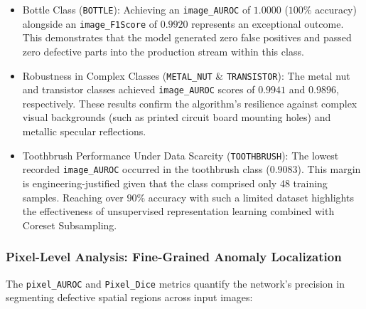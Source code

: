 \documentclass{article}
\begin{document}
\begin{itemize}
	\item Bottle Class (\texttt{BOTTLE}): Achieving an \texttt{image\_AUROC} of $1.0000$ ($100\%$ accuracy) alongside an \texttt{image\_F1Score} of $0.9920$ represents an exceptional outcome. This demonstrates that the model generated zero false positives and passed zero defective parts into the production stream within this class.
	
	\item Robustness in Complex Classes (\texttt{METAL\_NUT} \& \texttt{TRANSISTOR}): The metal nut and transistor classes achieved \texttt{image\_AUROC} scores of $0.9941$ and $0.9896$, respectively. These results confirm the algorithm's resilience against complex visual backgrounds (such as printed circuit board mounting holes) and metallic specular reflections.
	
	\item Toothbrush Performance Under Data Scarcity (\texttt{TOOTHBRUSH}): The lowest recorded \texttt{image\_AUROC} occurred in the toothbrush class ($0.9083$). This margin is engineering-justified given that the class comprised only 48 training samples. Reaching over $90\%$ accuracy with such a limited dataset highlights the effectiveness of unsupervised representation learning combined with Coreset Subsampling.
\end{itemize}

\subsubsection{Pixel-Level Analysis: Fine-Grained Anomaly Localization}

The \texttt{pixel\_AUROC} and \texttt{Pixel\_Dice} metrics quantify the network's precision in segmenting defective spatial regions across input images:
\end{document}
